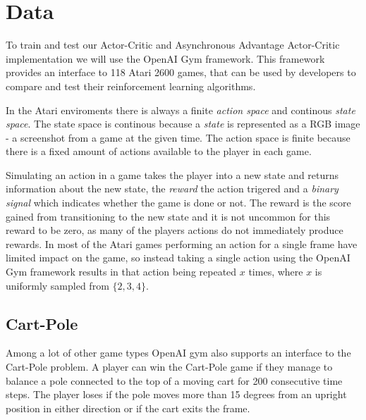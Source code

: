 \documentclass[11pt]{article}
\begin{document}
\maketitle

\section{Data}\label{Data}

To train and test our Actor-Critic and Asynchronous Advantage Actor-Critic implementation we will use
the OpenAI Gym framework\cite{openAIGym}.
This framework provides an interface to 118 Atari 2600 games,
that can be used by developers to compare and test their reinforcement learning algorithms.

 
In the Atari enviroments there is always a finite \textit{action space} and continous \textit{state space}.
The state space is continous because a \textit{state} is represented as a RGB image - a screenshot from a game
at the given time. The action space is finite because there is a fixed amount of
actions available to the player in each game.

Simulating an action in a game takes the player into a new state
and returns information about the new state,
the \textit{reward} the action trigered and a \textit{binary signal} which indicates whether the 
game is done or not.
The reward is the score gained from transitioning to the new state and
it is not uncommon for this reward to be zero, as many of the players actions do not immediately produce rewards.
In most of the Atari games performing an action for a single frame have limited impact on the game,
so instead taking a single action using the OpenAI Gym framework
results in that action being repeated $x$ times, where $x$ is uniformly sampled from $\{2, 3, 4\}$.

\subsection{Cart-Pole}

Among a lot of other game types OpenAI gym also supports an interface
to the Cart-Pole problem.
A player can win the Cart-Pole game if they manage to balance a pole connected to the top of a moving cart for
200 consecutive time steps.
The player loses if the pole moves more than 15 degrees from an upright position in
either direction or if the cart exits the frame.
\end{document}
